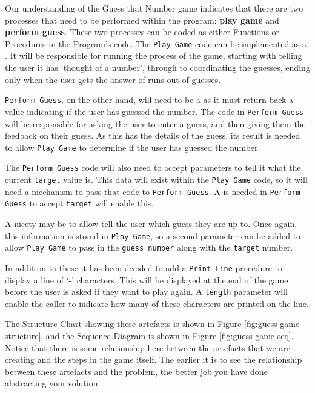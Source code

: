 Our understanding of the Guess that Number game indicates that there are two processes that need to be performed within the program: \textbf{play game} and \textbf{perform guess}. These two processes can be coded as either Functions or Procedures in the Program's code. The \texttt{Play Game} code can be implemented as a . It will be responsible for running the process of the game, starting with telling the user it has `thought of a number', through to coordinating the guesses, ending only when the user gets the answer of runs out of guesses.

\texttt{Perform Guess}, on the other hand, will need to be a  as it must return back a  value indicating if the user has guessed the number. The code in \texttt{Perform Guess} will be responsible for asking the user to enter a guess, and then giving them the feedback on their guess. As this has the details of the guess, its result is needed to allow \texttt{Play Game} to determine if the user has guessed the number.

The \texttt{Perform Guess} code will also need to accept parameters to tell it what the current \texttt{target} value is. This data will exist within the \texttt{Play Game} code, so it will need a mechanism to pass that code to \texttt{Perform Guess}. A  is needed in \texttt{Perform Guess} to accept \texttt{target} will enable this. 

A nicety may be to allow tell the user which guess they are up to. Once again, this information is stored in \texttt{Play Game}, so a second parameter can be added to allow \texttt{Play Game} to pass in the \texttt{guess number} along with the \texttt{target} number.

In addition to these it has been decided to add a \texttt{Print Line} procedure to display a line of `-' characters. This will be displayed at the end of the game before the user is asked if they want to play again. A \texttt{length} parameter will enable the caller to indicate how many of these characters are printed on the line.

The Structure Chart showing these artefacts is shown in Figure \ref{fig:guess-game-structure}, and the Sequence Diagram is shown in Figure \ref{fig:guess-game-seq}. Notice that there is some relationship here between the artefacts that we are creating and the steps in the game itself. The earlier it is to see the relationship between these artefacts and the problem, the better job you have done abstracting your solution.

